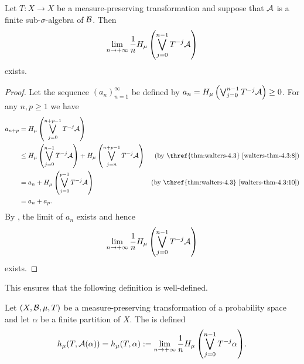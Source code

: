 \begin{corollary} \label{cor:walters-4-9-1}
	Let $T : X \to X$ be a measure-preserving transformation and suppose that $\mathcal{A}$ is a finite sub-$\sigma$-algebra of $\mathcal{B}$. Then
	\[
		\lim_{n \to +\infty}{\frac{1}{n} H_\mu\left(\bigvee_{j = 0}^{n - 1}{T^{-j}{\mathcal{A}}}\right)}
	\]
	exists.
	\begin{proof}
		Let the sequence $(a_n)_{n = 1}^\infty$ be defined by $a_n = H_\mu\left(\bigvee_{j = 0}^{n - 1}{T^{-j}{\mathcal{A}}}\right) \geq 0$. For any $n, p \geq 1$ we have
		\begin{align*}
			a_{n + p} &= H_\mu\left(\bigjoin_{j = 0}^{n + p - 1}{T^{-j}{\A}}\right) \\
				&\leq H_\mu\left(\bigjoin_{j = 0}^{n - 1}{T^{-j}{\A}}\right) + H_\mu\left(\bigjoin_{j = n}^{n + p - 1}{T^{-j}{\A}}\right) & \text{(by \thref{thm:walters-4.3} \ref{walters-thm-4.3:8})} \\
				&= a_n + H_\mu\left(\bigjoin_{j = 0}^{p - 1}{T^{-j}{\A}}\right) & \text{(by \thref{thm:walters-4.3} \ref{walters-thm-4.3:10})} \\
				&= a_n + a_p.
		\end{align*}
		By , the limit of $a_n$ exists and hence
		\[
			\lim_{n \to +\infty}{\frac{1}{n} H_\mu\left(\bigvee_{j = 0}^{n - 1}{T^{-j}{\mathcal{A}}}\right)}
		\]
		exists.
	\end{proof}
\end{corollary}

This ensures that the following definition is well-defined.

\begin{definition}
	Let $(X, \mathcal{B}, \mu, T)$ be a measure-preserving transformation of a probability space and let $\alpha$ be a finite partition of $X$. The  is defined
	\[
		h_\mu(T, \mathcal{A}(\alpha)) = h_\mu(T, \alpha) := \lim_{n \to +\infty}{\frac{1}{n} H_\mu\left(\bigvee_{j = 0}^{n - 1}{}T^{-j}{\alpha}\right)}.
	\]
\end{definition}


